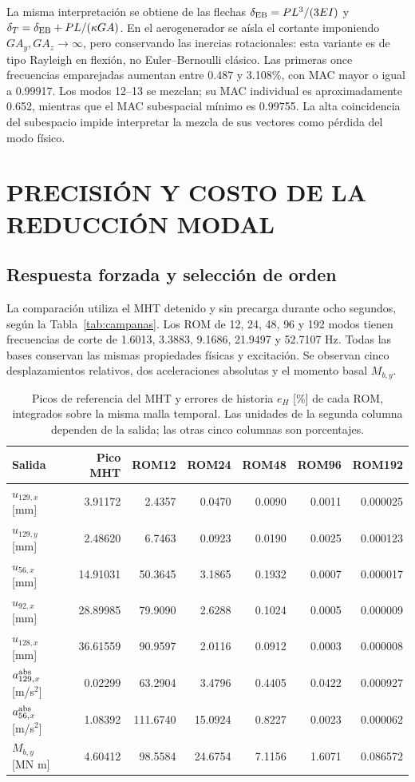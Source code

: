 \documentclass[oneside,a4paper,spanish,links,pagenumbers]{amca}
\begin{document}
La misma interpretación se obtiene de las flechas $\delta_{\rm EB}=PL^3/(3EI)$ y $\delta_T=\delta_{\rm EB}+PL/(\kappa GA)$. En el aerogenerador se aísla el cortante imponiendo $GA_y,GA_z\to\infty$, pero conservando las inercias rotacionales: esta variante es de tipo Rayleigh en flexión, no Euler--Bernoulli clásico. Las primeras once frecuencias emparejadas aumentan entre 0.487 y 3.108\%, con MAC mayor o igual a 0.99917. Los modos 12--13 se mezclan; su MAC individual es aproximadamente 0.652, mientras que el MAC subespacial mínimo es 0.99755. La alta coincidencia del subespacio impide interpretar la mezcla de sus vectores como pérdida del modo físico.



\section{PRECISIÓN Y COSTO DE LA REDUCCIÓN MODAL}
\label{sec:resultadosrom}
\subsection{Respuesta forzada y selección de orden}
La comparación utiliza el MHT detenido y sin precarga durante ocho segundos, según la Tabla~\ref{tab:campanas}. Los ROM de 12, 24, 48, 96 y 192 modos tienen frecuencias de corte de 1.6013, 3.3883, 9.1686, 21.9497 y 52.7107 Hz. Todas las bases conservan las mismas propiedades físicas y excitación. Se observan cinco desplazamientos relativos, dos aceleraciones absolutas y el momento basal $M_{b,y}$.

\begin{table}[htbp]\centering\small\setlength{\tabcolsep}{4pt}
\begin{tabular}{lrrrrrr}\toprule
Salida & Pico MHT & ROM12 & ROM24 & ROM48 & ROM96 & ROM192\\\midrule
$u_{129,x}$ [mm]&3.91172&2.4357&0.0470&0.0090&0.0011&0.000025\\
$u_{129,y}$ [mm]&2.48620&6.7463&0.0923&0.0190&0.0025&0.000123\\
$u_{56,x}$ [mm]&14.91031&50.3645&3.1865&0.1932&0.0007&0.000017\\
$u_{92,x}$ [mm]&28.89985&79.9090&2.6288&0.1024&0.0005&0.000009\\
$u_{128,x}$ [mm]&36.61559&90.9597&2.0116&0.0912&0.0003&0.000008\\
$a_{129,x}^{\rm abs}$ [m/s$^2$]&0.02299&63.2904&3.4796&0.4405&0.0422&0.000927\\
$a_{56,x}^{\rm abs}$ [m/s$^2$]&1.08392&111.6740&15.0924&0.8227&0.0023&0.000062\\
$M_{b,y}$ [MN m]&4.60412&98.5584&24.6754&7.1156&1.6071&0.086572\\\bottomrule
\end{tabular}
\caption{Picos de referencia del MHT y errores de historia $e_H$ [\%] de cada ROM, integrados sobre la misma malla temporal. Las unidades de la segunda columna dependen de la salida; las otras cinco columnas son porcentajes.}\label{tab:rom}
\end{table}
\end{document}
